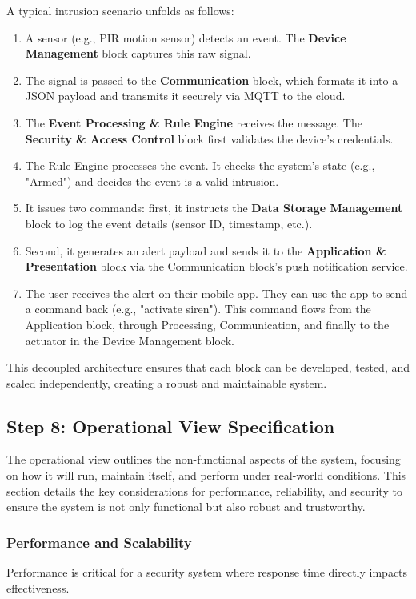 \documentclass[conference]{IEEEtran}
\begin{document}
A typical intrusion scenario unfolds as follows:
\begin{enumerate}
    \item A sensor (e.g., PIR motion sensor) detects an event. The \textbf{Device Management} block captures this raw signal.
    \item The signal is passed to the \textbf{Communication} block, which formats it into a JSON payload and transmits it securely via MQTT to the cloud.
    \item The \textbf{Event Processing \& Rule Engine} receives the message. The \textbf{Security \& Access Control} block first validates the device's credentials.
    \item The Rule Engine processes the event. It checks the system's state (e.g., "Armed") and decides the event is a valid intrusion.
    \item It issues two commands: first, it instructs the \textbf{Data Storage Management} block to log the event details (sensor ID, timestamp, etc.).
    \item Second, it generates an alert payload and sends it to the \textbf{Application \& Presentation} block via the Communication block's push notification service.
    \item The user receives the alert on their mobile app. They can use the app to send a command back (e.g., "activate siren"). This command flows from the Application block, through Processing, Communication, and finally to the actuator in the Device Management block.
\end{enumerate}
This decoupled architecture ensures that each block can be developed, tested, and scaled independently, creating a robust and maintainable system.




\subsection{Step 8: Operational View Specification}
The operational view outlines the non-functional aspects of the system, focusing on how it will run, maintain itself, and perform under real-world conditions. This section details the key considerations for performance, reliability, and security to ensure the system is not only functional but also robust and trustworthy.

\subsubsection{Performance and Scalability}
Performance is critical for a security system where response time directly impacts effectiveness.
\end{document}
